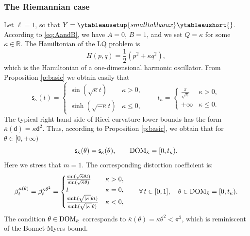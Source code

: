 \documentclass[11pt,a4paper]{article}
\theoremstyle{plain}
\theoremstyle{definition}
\theoremstyle{remark}
\numberwithin{equation}{section}
\newcommand{\R}{\mathbb{R}} %
\newcommand{\DOM}{{\rm{DOM}}}
\newcommand{\sfs}{\mathsf{s}}
\newcommand{\sfd}{\mathsf d}
\begin{document}
\subsubsection{The Riemannian case}\label{ss:Riemanniancase}
Let $\ell=1$, so that $Y=\ytableausetup{smalltableaux}\ytableaushort{\empty}$. According to \eqref{eq:AandB}, we have $A=0$, $B=1$, and we set $Q=\kappa$ for some $\kappa \in \R$. The Hamiltonian of the LQ problem is
\begin{equation}
H(p,q) = \frac{1}{2} \left(p^2+ \kappa q^2\right),
\end{equation}
which is the Hamiltonian of a one-dimensional harmonic oscillator. From Proposition \ref{p:basic} we obtain easily that
\begin{equation}
\sfs_{\kappa}(t) = \begin{cases} \sin(\sqrt{\kappa} t) & \kappa > 0, \\
\sinh(\sqrt{-\kappa}  t) & \kappa \leq 0,
\end{cases} \qquad t_{\kappa} = \begin{cases}
\frac{\pi}{ \sqrt{\kappa}} & \kappa >0, \\
+\infty & \kappa \leq 0.
\end{cases}
\end{equation}
The typical right hand side of Ricci curvature lower bounds has the form $\bar{\kappa}(\sfd) = \kappa \sfd^2$. Thus, according to Proposition \ref{p:basic}, we obtain that for $\theta \in [0,+\infty)$
\begin{equation}
\sfs_{\bar{\kappa}}(\theta) = \sfs_{\kappa}(\theta),  \qquad \DOM_{\bar\kappa} = [0,t_{\kappa}).
\end{equation}
Here we stress that $m=1$. The corresponding distortion coefficient is:
\begin{equation}
\beta_{t}^{\bar{\kappa}(\theta)} = \beta_{t}^{\kappa\theta^2}= \begin{cases}
\frac{\sin (\sqrt{\kappa} \theta t)}{\sin (\sqrt{\kappa}\theta)} & \kappa >0,\\
t & \kappa =0,\\
\frac{\sinh (\sqrt{|\kappa|} \theta t)}{\sinh (\sqrt{|\kappa|}\theta)} & \kappa<0,
\end{cases} \qquad \forall\, t\in [0,1], \quad \theta \in \DOM_{\bar\kappa}= [0,t_{\kappa}).
\end{equation}
The condition $\theta \in \DOM_{\bar\kappa}$ corresponds to $\bar\kappa(\theta) = \kappa \theta^2 < \pi^2$, which is reminiscent of the Bonnet-Myers bound.
\end{document}
